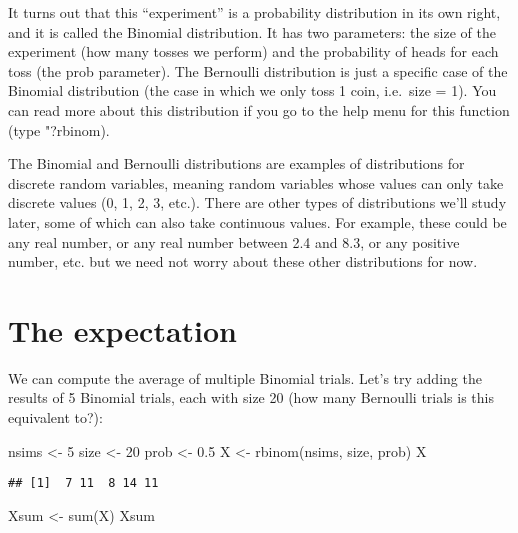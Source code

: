\documentclass[
]{book}
\newenvironment{Shaded}{\begin{snugshade}}{\end{snugshade}}
\newcommand{\DecValTok}[1]{\textcolor[rgb]{0.00,0.00,0.81}{#1}}
\newcommand{\FloatTok}[1]{\textcolor[rgb]{0.00,0.00,0.81}{#1}}
\newcommand{\FunctionTok}[1]{\textcolor[rgb]{0.00,0.00,0.00}{#1}}
\newcommand{\NormalTok}[1]{#1}
\newcommand{\OtherTok}[1]{\textcolor[rgb]{0.56,0.35,0.01}{#1}}
\begin{document}
It turns out that this ``experiment'' is a probability distribution in its own right, and it is called the Binomial distribution. It has two parameters: the size of the experiment (how many tosses we perform) and the probability of heads for each toss (the prob parameter). The Bernoulli distribution is just a specific case of the Binomial distribution (the case in which we only toss 1 coin, i.e.~size = 1). You can read more about this distribution if you go to the help menu for this function (type "?rbinom).

The Binomial and Bernoulli distributions are examples of distributions for discrete random variables, meaning random variables whose values can only take discrete values (0, 1, 2, 3, etc.). There are other types of distributions we'll study later, some of which can also take continuous values. For example, these could be any real number, or any real number between 2.4 and 8.3, or any positive number, etc. but we need not worry about these other distributions for now.

\hypertarget{the-expectation}{%
\section{The expectation}\label{the-expectation}}

We can compute the average of multiple Binomial trials. Let's try adding the results of 5 Binomial trials, each with size 20 (how many Bernoulli trials is this equivalent to?):

\begin{Shaded}
\begin{Highlighting}[]
\NormalTok{nsims }\OtherTok{\textless{}{-}} \DecValTok{5}
\NormalTok{size }\OtherTok{\textless{}{-}} \DecValTok{20}
\NormalTok{prob }\OtherTok{\textless{}{-}} \FloatTok{0.5}
\NormalTok{X }\OtherTok{\textless{}{-}} \FunctionTok{rbinom}\NormalTok{(nsims, size, prob)}
\NormalTok{X}
\end{Highlighting}
\end{Shaded}

\begin{verbatim}
## [1]  7 11  8 14 11
\end{verbatim}

\begin{Shaded}
\begin{Highlighting}[]
\NormalTok{Xsum }\OtherTok{\textless{}{-}} \FunctionTok{sum}\NormalTok{(X)}
\NormalTok{Xsum}
\end{Highlighting}
\end{Shaded}
\end{document}
